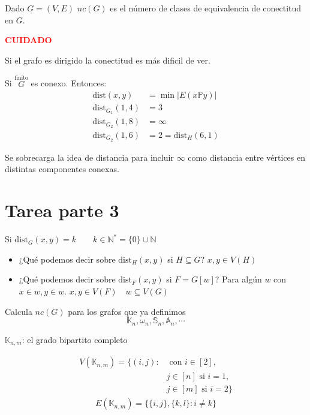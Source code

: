 \documentclass[../main.tex]{subfiles}
\begin{document}
Dado $G=(V,E)$ $nc(G)$ es el número de clases de equivalencia de conectitud
en $G$.

\begin{figure}[H]
	\centering
	
\end{figure}

{
	\Huge
	\bfseries
	\centering
	\textcolor{red}
	{
		CUIDADO
	}

}

Si el grafo es dirigido la conectitud es más dificil de ver.

\begin{figure}[H]
	\centering
	
\end{figure}

Si
\(
	\overset
	{
		\text{finito}
	}
	{
		G
	}
\)
es conexo. Entonces:
\begin{align*}
	\text{dist}(x,y) &= \min{|E(x\mathbb{P}y)|}\\
	\text{dist}_{G_1}(1,4) &= 3\\
	\text{dist}_{G_2}(1,8) &= \infty\\
	\text{dist}_{G_2}(1,6) &= 2= \text{dist}_{H}(6,1)
\end{align*}

Se sobrecarga la idea de distancia para incluir $\infty$ como distancia entre
vértices en distintas componentes conexas.

\section{Tarea parte 3}%
\label{sec:tarea_parte_3}

Si $\text{dist}_{G}(x,y)=k\qquad k\in\mathbb{N}^*=\{0\}\cup\mathbb{N}$

\begin{itemize}
	\item ¿Qué podemos decir sobre $\text{dist}_H(x,y)$ si $H\subseteq G$?
		$x,y\in V(H)$
	\item ¿Qué podemos decir sobre $\text{dist}_F(x,y)$ si $F=G[w]$?
		Para algún $w$ con $x\in w, y\in w$.
		$x,y\in V(F)\quad w\subseteq V(G)$
\end{itemize}

Calcula $nc(G)$ para los grafos que ya definimos
\[
	\mathbb{K}_n, \omega_n, \mathbb{S}_n, \mathbb{A}_n, \cdots
\]

$\mathbb{K}_{n,m}$: el grado bipartito completo

\begin{align*}
	V(\mathbb{K}_{n,m})=
	\{
		(i,j):
		&\text{ con }i\in [2],\\
		&j \in[n]\text{ si } i=1,\\
		&j\in[m]\text{ si }i=2
	\}
\end{align*}
\begin{align*}
	E(\mathbb{K}_{n,m})=\{\{i,j\},\{k,l\}:i\neq k\}
\end{align*}
\end{document}
